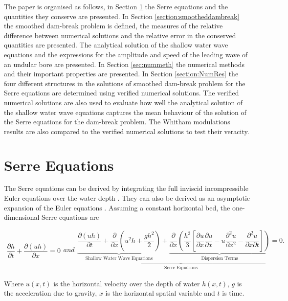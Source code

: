 \documentclass[times]{elsarticle}
\begin{document}
The paper is organised as follows, in Section \ref{section:Serre Equations} the Serre equations and the quantities they conserve are presented. In Section \ref{section:smootheddambreak} the smoothed dam-break problem is defined, the measures of the relative difference between numerical solutions and the relative error in the conserved quantities are presented. The analytical solution of the shallow water wave equations and the expressions for the amplitude and speed of the leading wave of an undular bore are presented. In Section \ref{sec:nummeth} the numerical methods and their important properties are presented. In Section \ref{section:NumRes} the four different structures in the solutions of smoothed dam-break problem for the Serre equations are determined using verified numerical solutions. The verified numerical solutions are also used to evaluate how well the analytical solution of the shallow water wave equations captures the mean behaviour of the solution of the Serre equations for the dam-break problem. The Whitham modulations results are also compared to the verified numerical solutions to test their veracity.

\section{Serre Equations}
\label{section:Serre Equations}
The Serre equations can be derived by integrating the full inviscid incompressible Euler equations over the water depth \cite{Su-Gardener-1969-536}. They can also be derived as an asymptotic expansion of the Euler equations \cite{Bonneton-Lannes-2009-16601}. Assuming a constant horizontal bed, the one-dimensional Serre equations are \cite{Guyenne-etal-2014-169}
\begin{linenomath*}
\begin{subequations}\label{eq:Serre_nonconservative_form}
\begin{gather}
\dfrac{\partial h}{\partial t} + \dfrac{\partial (uh)}{\partial x} = 0
\label{eq:Serre_continuity}
\end{gather}
and
\begin{gather}
\underbrace{\underbrace{\dfrac{\partial (uh)}{\partial t} + \dfrac{\partial}{\partial x} \left ( u^2h + \dfrac{gh^2}{2}\right )}_{\text{Shallow Water Wave Equations}} + \underbrace{\dfrac{\partial}{\partial x} \left (  \dfrac{h^3}{3} \left [ \dfrac{\partial u }{\partial x} \dfrac{\partial u}{\partial x} - u\dfrac{\partial^2 u}{\partial x^2}  - \dfrac{\partial^2 u}{\partial x \partial t}\right ] \right )}_{\text{Dispersion Terms}} = 0.}_{\text{Serre Equations}}
\label{eq:Serre_momentum}
\end{gather}
\end{subequations}
\end{linenomath*}
Where $u(x,t)$ is the horizontal velocity over the depth of water $h(x,t)$, $g$ is the acceleration due to gravity, $x$ is the horizontal spatial variable and $t$ is time. 
\end{document}
